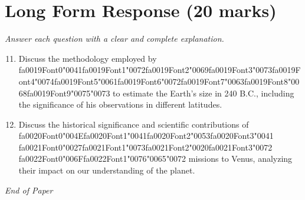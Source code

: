 \documentclass[12pt]{article}
\begin{document}
\section*{Long Form Response (20 marks)}
\textit{Answer each question with a clear and complete explanation.}
\begin{enumerate}[label=\arabic*.]
\setcounter{enumi}{10}
\item Discuss the methodology employed by {\csname fa0019Font0\endcsname\char"0041}{\csname fa0019Font1\endcsname\char"0072}{\csname fa0019Font2\endcsname\char"0069}{\csname fa0019Font3\endcsname\char"0073}{\csname fa0019Font4\endcsname\char"0074}{\csname fa0019Font5\endcsname\char"0061}{\csname fa0019Font6\endcsname\char"0072}{\csname fa0019Font7\endcsname\char"0063}{\csname fa0019Font8\endcsname\char"0068}{\csname fa0019Font9\endcsname\char"0075}{\char"0073} to estimate the Earth's size in 240 B.C.,
including the significance of his observations in different latitudes.
\item Discuss the historical significance and scientific contributions of {\csname fa0020Font0\endcsname\char"004E}{\csname fa0020Font1\endcsname\char"0041}{\csname fa0020Font2\endcsname\char"0053}{\csname fa0020Font3\endcsname\char"0041} {\csname fa0021Font0\endcsname\char"0027}{\csname fa0021Font1\endcsname\char"0073}{\csname fa0021Font2\endcsname\char"0020}{\csname fa0021Font3\endcsname\char"0072} {\csname fa0022Font0\endcsname\char"006F}{\csname fa0022Font1\endcsname\char"0076}{\char"0065}{\char"0072}
missions to Venus, analyzing their impact on our understanding of the planet.
\end{enumerate}

\vfill
\noindent\textit{End of Paper}
\end{document}
